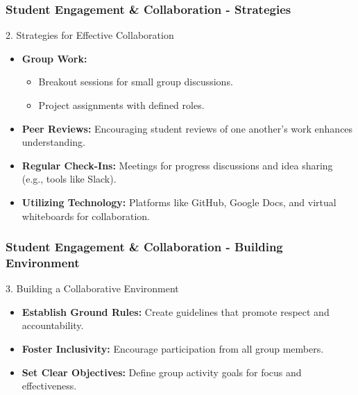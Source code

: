 \documentclass[aspectratio=169]{beamer}
\begin{document}
\begin{frame}[fragile]
    \frametitle{Student Engagement \& Collaboration - Strategies}
    \begin{block}{2. Strategies for Effective Collaboration}
        \begin{itemize}
            \item \textbf{Group Work:}
                \begin{itemize}
                    \item Breakout sessions for small group discussions.
                    \item Project assignments with defined roles.
                \end{itemize}
            
            \item \textbf{Peer Reviews:} Encouraging student reviews of one another's work enhances understanding.
            
            \item \textbf{Regular Check-Ins:} Meetings for progress discussions and idea sharing (e.g., tools like Slack).
            
            \item \textbf{Utilizing Technology:} Platforms like GitHub, Google Docs, and virtual whiteboards for collaboration.
        \end{itemize}
    \end{block}
\end{frame}

\begin{frame}[fragile]
    \frametitle{Student Engagement \& Collaboration - Building Environment}
    \begin{block}{3. Building a Collaborative Environment}
        \begin{itemize}
            \item \textbf{Establish Ground Rules:} Create guidelines that promote respect and accountability.
            \item \textbf{Foster Inclusivity:} Encourage participation from all group members.
            \item \textbf{Set Clear Objectives:} Define group activity goals for focus and effectiveness.
        \end{itemize}
    \end{block}
\end{frame}
\end{document}
